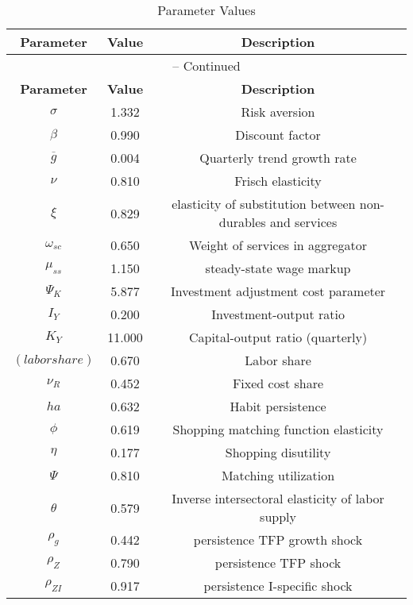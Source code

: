 \begin{center}
\begin{longtable}{ccc}
\caption{Parameter Values}\\%
\toprule%
\multicolumn{1}{c}{\textbf{Parameter}} &
\multicolumn{1}{c}{\textbf{Value}} &
 \multicolumn{1}{c}{\textbf{Description}}\\%
\midrule%
\endfirsthead
\multicolumn{3}{c}{{\tablename} \thetable{} -- Continued}\\%
\midrule%
\multicolumn{1}{c}{\textbf{Parameter}} &
\multicolumn{1}{c}{\textbf{Value}} &
  \multicolumn{1}{c}{\textbf{Description}}\\%
\midrule%
\endhead
${\sigma}$ 	 & 	 1.332 	 & 	 Risk aversion\\
${\beta}$ 	 & 	 0.990 	 & 	 Discount factor\\
${\overline{g}}$ 	 & 	 0.004 	 & 	 Quarterly trend growth rate\\
$\nu$ 	 & 	 0.810 	 & 	 Frisch elasticity\\
$\xi$ 	 & 	 0.829 	 & 	 elasticity of substitution between non-durables and services\\
$\omega_{sc}$ 	 & 	 0.650 	 & 	 Weight of services in aggregator\\
$\mu_{ss}$ 	 & 	 1.150 	 & 	 steady-state wage markup\\
${\Psi_{K}}$ 	 & 	 5.877 	 & 	 Investment adjustment cost parameter\\
${I_Y}$ 	 & 	 0.200 	 & 	 Investment-output ratio\\
${K_Y}$ 	 & 	 11.000 	 & 	 Capital-output ratio (quarterly)\\
$(labor share)$ 	 & 	 0.670 	 & 	 Labor share\\
${\nu_R}$ 	 & 	 0.452 	 & 	 Fixed cost share\\
${ha}$ 	 & 	 0.632 	 & 	 Habit persistence\\
${\phi}$ 	 & 	 0.619 	 & 	 Shopping matching function elasticity\\
${\eta}$ 	 & 	 0.177 	 & 	 Shopping disutility\\
${\Psi}$ 	 & 	 0.810 	 & 	 Matching utilization\\
${\theta}$ 	 & 	 0.579 	 & 	 Inverse intersectoral elasticity of labor supply\\
${\rho_g}$ 	 & 	 0.442 	 & 	 persistence TFP growth shock\\
${\rho_Z}$ 	 & 	 0.790 	 & 	 persistence TFP shock\\
${\rho_{ZI}}$ 	 & 	 0.917 	 & 	 persistence I-specific shock\\

\end{longtable}
\end{center}
